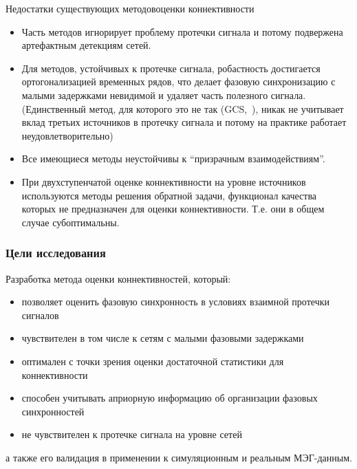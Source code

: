 \documentclass[12pt]{beamer}
\begin{document}
\begin{frame}[t]{Недостатки существующих методов}{оценки коннективности}
    \begin{itemize}
        \footnotesize
        \item Часть методов игнорирует проблему протечки сигнала и потому подвержена
            артефактным детекциям сетей.
        \item Для методов, устойчивых к протечке сигнала, робастность достигается ортогонализацией временных рядов, что делает фазовую синхронизацию с малыми задержками невидимой и удаляет часть полезного сигнала.
            (Единственный метод, для которого это не так (GCS,~\cite{Wens2015}),
            никак не учитывает вклад третьих источников в протечку сигнала и потому на практике работает неудовлетворительно)
        \item Все имеющиеся методы неустойчивы к ``призрачным взаимодействиям''.
        \item При двухступенчатой оценке коннективности на уровне источников используются методы решения
            обратной задачи, функционал качества которых не предназначен для оценки коннективности.             Т.е. они в общем случае субоптимальны.
    \end{itemize}
\end{frame}

\begin{frame}[t]
    \frametitle{Цели исследования}
    
 Разработка метода оценки коннективностей, который:
\begin{itemize}
        \item позволяет оценить фазовую синхронность в условиях взаимной протечки сигналов
        \item чувствителен в том числе к сетям с малыми фазовыми задержками
        \item оптимален с точки зрения оценки достаточной статистики для коннективности
        \item способен учитывать априорную информацию об организации фазовых синхронностей
        \item не чувствителен к протечке сигнала на уровне сетей
\end{itemize}
а также его валидация в применении к симуляционным и реальным МЭГ-данным.
\end{frame}

\end{document}
